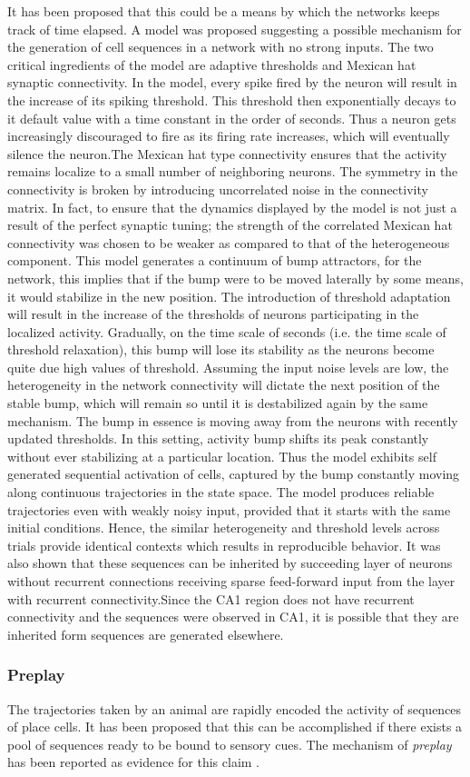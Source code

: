 It has been proposed that this could be a means by which the networks keeps track of time elapsed. A model was proposed suggesting a possible mechanism for the generation of cell sequences in a network with no strong inputs.  The two critical ingredients of the model are adaptive thresholds and Mexican hat synaptic connectivity. In the model, every spike fired by the neuron will result in the increase of its spiking threshold. This threshold then exponentially decays to it default value with a time constant in the order of seconds. Thus a neuron gets increasingly discouraged to fire as its firing rate increases, which will eventually silence the neuron.The Mexican hat type connectivity ensures that the activity remains localize to a small number of neighboring neurons. The symmetry in the connectivity is broken by introducing uncorrelated noise in the connectivity matrix. In fact, to ensure that the dynamics displayed by the model is not just a result of the perfect synaptic tuning; the strength of the correlated Mexican hat connectivity was chosen to be weaker as compared to that of the heterogeneous component. This model generates a continuum of bump attractors, for the network, this implies that if the bump were to be moved laterally by some means, it would stabilize in the new position.  The introduction of threshold adaptation will result in the increase of the thresholds of neurons participating in the localized activity. Gradually, on the time scale of seconds (i.e. the time scale of threshold relaxation), this bump will lose its stability as the neurons become quite due high values of threshold. Assuming the input noise levels are low, the heterogeneity in the network connectivity will dictate the next position of the stable bump, which will remain so until it is destabilized again by the same mechanism. The bump in essence is moving away from the neurons with recently updated thresholds. In this setting, activity bump shifts its peak constantly without ever stabilizing at a particular location. Thus the model exhibits self generated sequential activation of cells, captured by the bump constantly moving along continuous trajectories in the state space. The model produces reliable trajectories even with weakly noisy input, provided that it starts with the same initial conditions. Hence, the similar heterogeneity and threshold levels across trials provide identical contexts which results in reproducible behavior. It was also shown that these sequences can be inherited by succeeding layer of neurons without recurrent connections receiving sparse feed-forward input from the layer with recurrent connectivity.Since the CA1 region does not have recurrent connectivity and the sequences were observed in CA1, it is possible that they are inherited form sequences are generated elsewhere.


\subsubsection{Preplay}
The trajectories taken by an animal are rapidly encoded the activity of sequences of place cells. It has been proposed that this can be accomplished if there exists a pool of sequences ready to be bound to sensory cues. The mechanism of \emph{preplay} has been reported as evidence for this claim  \cite{Dragoi2011, Dragoi2013a}. 
